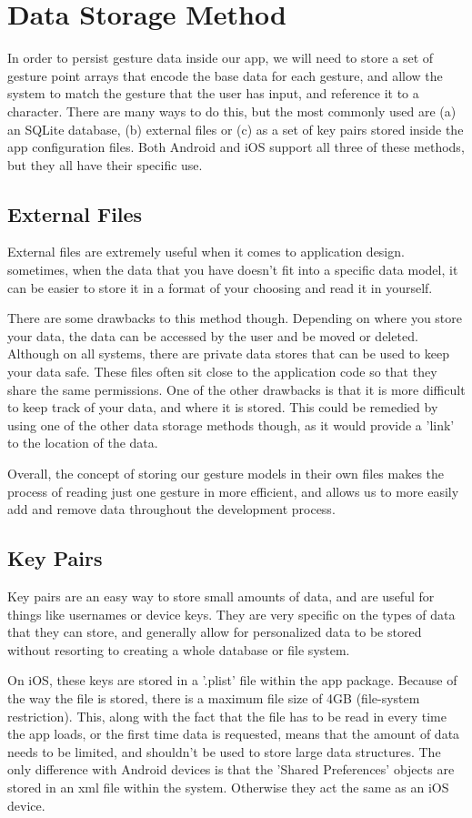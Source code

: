 \documentclass[onecolumn, draftclsnofoot,10pt, journal, letterpaper]{IEEEtran}
\begin{document}
\section{Data Storage Method}
    In order to persist gesture data inside our app, we will need to store a set of gesture point arrays that encode the base data for each gesture, and allow the system to match the gesture that the user has input, and reference it to a character. There are many ways to do this, but the most commonly used are (a) an SQLite database, (b) external files or (c) as a set of key pairs stored inside the app configuration files. Both Android and iOS support all three of these methods, but they all have their specific use.
    
    \subsection{External Files}
        External files are extremely useful when it comes to application design. sometimes, when the data that you have doesn't fit into a specific data model, it can be easier to store it in a format of your choosing and read it in yourself.\par There are some drawbacks to this method though. Depending on where you store your data, the data can be accessed by the user and be moved or deleted. Although on all systems, there are private data stores that can be used to keep your data safe. These files often sit close to the application code so that they share the same permissions. One of the other drawbacks is that it is more difficult to keep track of your data, and where it is stored. This could be remedied by using one of the other data storage methods though, as it would provide a 'link' to the location of the data.\par
        Overall, the concept of storing our gesture models in their own files makes the process of reading just one gesture in more efficient, and allows us to more easily add and remove data throughout the development process.
    
    \subsection{Key Pairs}
        Key pairs are an easy way to store small amounts of data, and are useful for things like usernames or device keys. They are very specific on the types of data that they can store, and generally allow for personalized data to be stored without resorting to creating a whole database or file system.\par
        On iOS, these keys are stored in a '.plist' file within the app package. Because of the way the file is stored, there is a maximum file size of 4GB (file-system restriction). \cite{noauthor_ios_2019} This, along with the fact that the file has to be read in every time the app loads, or the first time data is requested, means that the amount of data needs to be limited, and shouldn't be used to store large data structures. The only difference with Android devices is that the 'Shared Preferences' objects are stored in an xml file within the system. \cite{tarun_kumar_top_2018} Otherwise they act the same as an iOS device.
    
\end{document}
